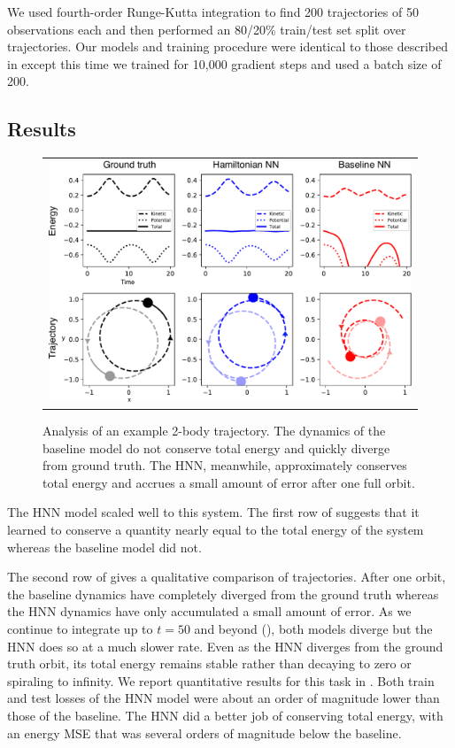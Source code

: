 \documentclass{article}
\begin{document}
We used fourth-order Runge-Kutta integration to find 200 trajectories of 50 observations each and then performed an 80/20\% train/test set split over trajectories. Our models and training procedure were identical to those described in  except this time we trained for 10,000 gradient steps and used a batch size of 200.



\subsection{Results}

\begin{figure}
\centering
\vspace{-.3cm}%
\begin{tabular}{c}
\setlength{\tabcolsep}{0pt}
\includegraphics[width=.55\textwidth]{static/orbit-results}
\end{tabular}
\caption{
    Analysis of an example 2-body trajectory. The dynamics of the baseline model do not conserve total energy and quickly diverge from ground truth. The HNN, meanwhile, approximately conserves total energy and accrues a small amount of error after one full orbit.
}
\end{figure}

The HNN model scaled well to this system. The first row of  suggests that it learned to conserve a quantity nearly equal to the total energy of the system whereas the baseline model did not.

The second row of  gives a qualitative comparison of trajectories. After one orbit, the baseline dynamics have completely diverged from the ground truth whereas the HNN dynamics have only accumulated a small amount of error. As we continue to integrate up to $t=50$ and beyond (), both models diverge but the HNN does so at a much slower rate. Even as the HNN diverges from the ground truth orbit, its total energy remains stable rather than decaying to zero or spiraling to infinity. We report quantitative results for this task in . Both train and test losses of the HNN model were about an order of magnitude lower than those of the baseline. The HNN did a better job of conserving total energy, with an energy MSE that was several orders of magnitude below the baseline.
\end{document}
